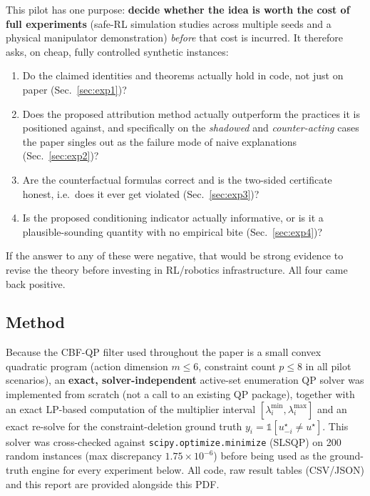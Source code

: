\documentclass[11pt]{article}
\begin{document}
This pilot has one purpose: \textbf{decide whether the idea is worth the cost
of full experiments} (safe-RL simulation studies across multiple seeds and a
physical manipulator demonstration) \emph{before} that cost is incurred. It
therefore asks, on cheap, fully controlled synthetic instances:
\begin{enumerate}[leftmargin=1.6em]
  \item Do the claimed identities and theorems actually hold in code, not
        just on paper (Sec.~\ref{sec:exp1})?
  \item Does the proposed attribution method actually outperform the
        practices it is positioned against, and specifically on the
        \emph{shadowed} and \emph{counter-acting} cases the paper singles out
        as the failure mode of naive explanations (Sec.~\ref{sec:exp2})?
  \item Are the counterfactual formulas correct and is the two-sided
        certificate honest, i.e.\ does it ever get violated
        (Sec.~\ref{sec:exp3})?
  \item Is the proposed conditioning indicator actually informative, or is it
        a plausible-sounding quantity with no empirical bite
        (Sec.~\ref{sec:exp4})?
\end{enumerate}
If the answer to any of these were negative, that would be strong evidence to
revise the theory before investing in RL/robotics infrastructure. All four
came back positive.

\subsection*{Method}
Because the CBF-QP filter used throughout the paper is a small convex
quadratic program (action dimension $m\le 6$, constraint count $p\le 8$ in all
pilot scenarios), an \textbf{exact, solver-independent} active-set enumeration
QP solver was implemented from scratch (not a call to an existing QP package),
together with an exact LP-based computation of the multiplier interval
$[\lambda_i^{\min},\lambda_i^{\max}]$ and an exact re-solve for the
constraint-deletion ground truth $y_i = \mathbb{1}[u^\star_{-i}\neq u^\star]$.
This solver was cross-checked against \texttt{scipy.optimize.minimize}
(SLSQP) on 200 random instances (max discrepancy $1.75\times10^{-6}$) before
being used as the ground-truth engine for every experiment below. All code,
raw result tables (CSV/JSON) and this report are provided alongside this PDF.

\end{document}
